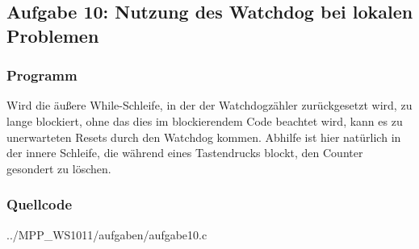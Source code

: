 \subsection*{Aufgabe 10: Nutzung des Watchdog bei lokalen Problemen}

\subsubsection*{Programm}
Wird die äußere While-Schleife, in der der Watchdogzähler zurückgesetzt wird, zu lange
blockiert, ohne das dies im blockierendem Code beachtet wird, kann es zu unerwarteten
Resets durch den Watchdog kommen. Abhilfe ist hier natürlich in der innere Schleife, die
während eines Tastendrucks blockt, den Counter gesondert zu löschen.


\subsubsection*{Quellcode}

{../MPP_WS1011/aufgaben/aufgabe10.c}

\begin{comment}
Wie können Sie registrieren und speichern, wann und an welcher Programmstelle der Watchdog das System neu gestartet hat.

Skizzieren Sie einen Lösungsansatz. Als Hilfestellung hier folgende Stichwörter:

    NMI-Interrupt
    Stackpointer
    Programcounter
    Softwarereset
    INFOMEM
\end{comment}
